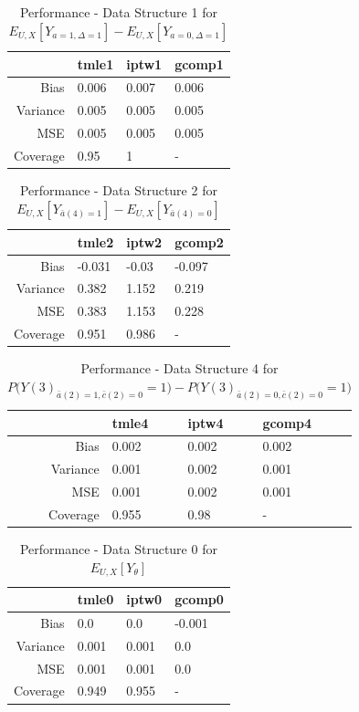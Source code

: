 \documentclass{exam}
\begin{document}
\begin{table}[!h]
\centering
\begin{tabular}{rlll}
  \hline
 & tmle1 & iptw1 & gcomp1 \\ 
  \hline
Bias & 0.006 & 0.007 & 0.006 \\ 
  Variance & 0.005 & 0.005 & 0.005 \\ 
  MSE & 0.005 & 0.005 & 0.005 \\ 
  Coverage & 0.95 & 1 & - \\ 
   \hline
\end{tabular}
\caption{Performance - Data Structure 1 for $E_{U,X}[Y_{a=1, \Delta=1}] - E_{U,X}[Y_{a=0, \Delta=1}]$} 
\end{table}
\begin{table}[!h]
\centering
\begin{tabular}{rlll}
  \hline
 & tmle2 & iptw2 & gcomp2 \\ 
  \hline
Bias & -0.031 & -0.03 & -0.097 \\ 
  Variance & 0.382 & 1.152 & 0.219 \\ 
  MSE & 0.383 & 1.153 & 0.228 \\ 
  Coverage & 0.951 & 0.986 & - \\ 
   \hline
\end{tabular}
\caption{Performance - Data Structure 2 for $E_{U,X}[Y_{\bar{a}(4)=1}] - E_{U,X}[Y_{\bar{a}(4)=0}]$} 
\end{table}
\begin{table}[!h]
\centering
\begin{tabular}{rlll}
  \hline
 & tmle4 & iptw4 & gcomp4 \\ 
  \hline
Bias & 0.002 & 0.002 & 0.002 \\ 
  Variance & 0.001 & 0.002 & 0.001 \\ 
  MSE & 0.001 & 0.002 & 0.001 \\ 
  Coverage & 0.955 & 0.98 & - \\ 
   \hline
\end{tabular}
\caption{Performance - Data Structure 4 for $P\big(Y(3)_{\bar{a}(2) = 1, \bar{c}(2) = 0} = 1\big) - P\big(Y(3)_{\bar{a}(2) = 0, \bar{c}(2) = 0} = 1\big)$} 
\end{table}
\begin{table}[!h]
\centering
\begin{tabular}{rlll}
  \hline
 & tmle0 & iptw0 & gcomp0 \\ 
  \hline
Bias & 0.0 & 0.0 & -0.001 \\ 
  Variance & 0.001 & 0.001 & 0.0 \\ 
  MSE & 0.001 & 0.001 & 0.0 \\ 
  Coverage & 0.949 & 0.955 & - \\ 
   \hline
\end{tabular}
\caption{Performance - Data Structure 0 for $E_{U,X}[Y_{\theta}]$} 
\end{table}
\end{document}
